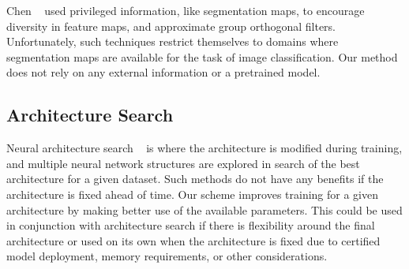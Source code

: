 Chen \etal ~\cite{Chen2017TrainingGO} used privileged information, like segmentation maps, to encourage diversity in feature maps, and approximate group orthogonal filters.
Unfortunately, such techniques restrict themselves to domains where segmentation maps are available for the task of image classification. 
Our method does not rely on any external information or a pretrained model.

\subsection{Architecture Search } %
Neural architecture search ~\cite{Liu2017ProgressiveNA, Real2018RegularizedEF, Zoph2016NeuralAS} is where the architecture is modified during training, and multiple neural network structures are explored in search of the best architecture for a given dataset. Such methods do not have any benefits if the architecture is fixed ahead of time. Our scheme improves training for a given architecture by making better use of the available parameters. This could be used in conjunction with architecture search if there is flexibility around the final architecture or used on its own when the architecture is fixed due to certified model deployment, memory requirements, or other considerations.

